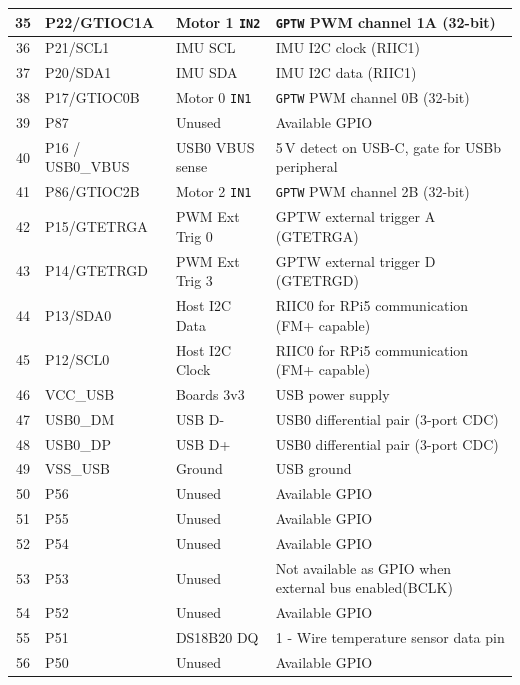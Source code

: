 \begin{longtable} { | c | l | l | p{5cm} |}
\hline
\rowcolor{blue!20}
35 & P22/GTIOC1A & Motor 1 \texttt{IN2} & \texttt{GPTW} PWM channel 1A (32-bit) \\
\hline
\rowcolor{violet!15}
36 & P21/SCL1 & IMU SCL & IMU I2C clock (RIIC1) \\
\hline
\rowcolor{violet!15}
37 & P20/SDA1 & IMU SDA & IMU I2C data (RIIC1) \\
\hline
\rowcolor{blue!20}
38 & P17/GTIOC0B & Motor 0 \texttt{IN1} & \texttt{GPTW} PWM channel 0B (32-bit) \\
\hline
39 & P87 & Unused &Available GPIO \\
\hline
\rowcolor{gray!15}
40 & P16 / USB0\_VBUS & USB0 VBUS sense & 5\,V detect on USB-C, gate for USBb peripheral \\
\hline
\rowcolor{blue!20}
41 & P86/GTIOC2B & Motor 2 \texttt{IN1} & \texttt{GPTW} PWM channel 2B (32-bit) \\
\hline
\rowcolor{lime!10}
42 & P15/GTETRGA & PWM Ext Trig 0 & GPTW external trigger A (GTETRGA) \\
\hline
\rowcolor{lime!10}
43 & P14/GTETRGD & PWM Ext Trig 3 & GPTW external trigger D (GTETRGD) \\
\hline
\rowcolor{violet!15} 44 & P13/SDA0 & Host I2C Data & RIIC0 for RPi5 communication (FM+ capable) \\
\hline
\rowcolor{violet!15} 45 & P12/SCL0 & Host I2C Clock & RIIC0 for RPi5 communication (FM+ capable) \\
\hline
\rowcolor{gray!15}
46 & VCC\_USB &Boards 3v3 & USB power supply \\
\hline
\rowcolor{gray!15}
47 & USB0\_DM & USB D- & USB0 differential pair (3-port CDC) \\
\hline
\rowcolor{gray!15}
48 & USB0\_DP & USB D+ & USB0 differential pair (3-port CDC) \\
\hline
\rowcolor{gray!15}
49 & VSS\_USB &Ground &USB ground \\
\hline
50 & P56 & Unused &Available GPIO \\
\hline
51 & P55 & Unused &Available GPIO \\
\hline
52 & P54 & Unused &Available GPIO \\
\hline
53 & P53 & Unused &Not available as GPIO when external bus enabled(BCLK) \\
\hline
54 & P52 & Unused & Available GPIO \\
\hline
\rowcolor{lime!10}
55 & P51 &DS18B20 DQ & 1 - Wire temperature sensor data pin \\
\hline
56 & P50 & Unused & Available GPIO \\

\end{longtable}
